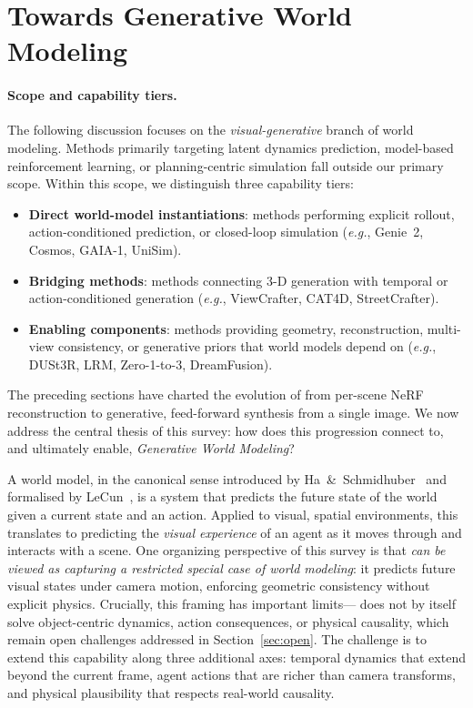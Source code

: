 \section{Towards Generative World Modeling}
\label{sec:world}

\paragraph{Scope and capability tiers.}
The following discussion focuses on the \emph{visual-generative} branch of world modeling. Methods primarily targeting latent dynamics prediction, model-based reinforcement learning, or planning-centric simulation fall outside our primary scope. Within this scope, we distinguish three capability tiers:
\begin{itemize}
  \item \textbf{Direct world-model instantiations}: methods performing explicit rollout, action-conditioned prediction, or closed-loop simulation (\emph{e.g.}, Genie~2, Cosmos, GAIA-1, UniSim).
  \item \textbf{Bridging methods}: methods connecting 3-D generation with temporal or action-conditioned generation (\emph{e.g.}, ViewCrafter, CAT4D, StreetCrafter).
  \item \textbf{Enabling components}: methods providing geometry, reconstruction, multi-view consistency, or generative priors that world models depend on (\emph{e.g.}, DUSt3R, LRM, Zero-1-to-3, DreamFusion).
\end{itemize}

The preceding sections have charted the evolution of \nvs{} from per-scene
NeRF reconstruction to generative, feed-forward synthesis from a single image.
We now address the central thesis of this survey: how does this progression
connect to, and ultimately enable, \emph{Generative World Modeling}?

A world model, in the canonical sense introduced by
Ha~\&~Schmidhuber~\citep{ha2018worldmodels} and formalised by
LeCun~\citep{lecun2022path}, is a system that predicts the future state of
the world given a current state and an action.
Applied to visual, spatial environments, this translates to predicting the
\emph{visual experience} of an agent as it moves through and interacts with
a scene.
One organizing perspective of this survey is that \nvs{} \emph{can be viewed as capturing a restricted special case of world modeling}: it predicts future visual states under camera motion, enforcing geometric consistency without explicit physics. Crucially, this framing has important limits---\nvs{} does not by itself solve object-centric dynamics, action consequences, or physical causality, which remain open challenges addressed in Section~\ref{sec:open}.
The challenge is to extend this capability along three additional axes:
temporal dynamics that extend beyond the current frame,
agent actions that are richer than camera transforms,
and physical plausibility that respects real-world causality.


